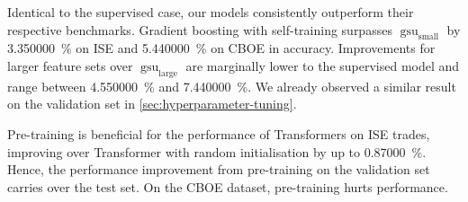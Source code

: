 Identical to the supervised case, our models consistently outperform their respective benchmarks. Gradient boosting with self-training surpasses $\operatorname{gsu}_{\mathrm{small}}$ by \SI{3.350000}{\percent} on \gls{ISE} and \SI{5.440000}{\percent} on \gls{CBOE} in accuracy. Improvements for larger feature sets over $\operatorname{gsu}_{\mathrm{large}}$ are marginally lower to the supervised model and range between \SI{4.550000}{\percent} and \SI{7.440000}{\percent}. We already observed a similar result on the validation set in \cref{sec:hyperparameter-tuning}.

Pre-training is beneficial for the performance of Transformers on \gls{ISE} trades, improving over Transformer with random initialisation by up to \SI{0.87000}{\percent}. Hence, the performance improvement from pre-training on the validation set carries over the test set. On the \gls{CBOE} dataset, pre-training hurts performance.


